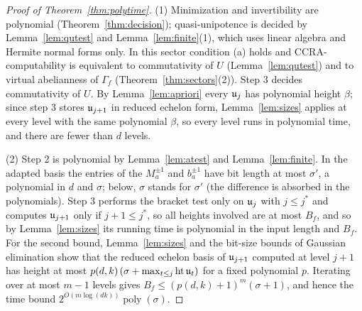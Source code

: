 \begin{proof}[Proof of Theorem~\ref{thm:polytime}]
(1) Minimization and invertibility are polynomial (Theorem~\ref{thm:decision}); quasi-unipotence is
decided by Lemma~\ref{lem:qutest} and Lemma~\ref{lem:finite}(1), which uses linear algebra and Hermite
normal forms only. In this sector condition (a) holds and CCRA-computability is equivalent to
commutativity of $U$ (Lemma~\ref{lem:qutest}) and to virtual abelianness of $\Gamma_f$
(Theorem~\ref{thm:sectors}(2)). Step 3 decides commutativity of $U$. By Lemma~\ref{lem:apriori}
every $\mathfrak{u}_j$ has polynomial height $\beta$; since step 3 stores $\mathfrak{u}_{j+1}$ in reduced echelon form,
Lemma~\ref{lem:sizes} applies at every level with the same polynomial $\beta$, so every level runs in
polynomial time, and there are fewer than $d$ levels.

(2) Step 2 is polynomial by Lemma~\ref{lem:atest} and Lemma~\ref{lem:finite}. In the adapted basis the
entries of the $M_a^{\pm1}$ and $b_a^{\pm1}$ have bit length at most $\sigma'$, a polynomial in $d$ and
$\sigma$; below, $\sigma$ stands for $\sigma'$ (the difference is absorbed in the polynomials). Step 3 performs the bracket test only on
$\mathfrak{u}_j$ with $j\le j^*$ and computes $\mathfrak{u}_{j+1}$ only if $j+1\le j^*$, so all heights involved are at most
$B_f$, and so by Lemma~\ref{lem:sizes} its running time is polynomial
in the input length and $B_f$. For the second bound, Lemma~\ref{lem:sizes} and the bit-size bounds of
Gaussian elimination show that the reduced echelon basis of $\mathfrak{u}_{j+1}$ computed at level $j+1$ has
height at most $p(d,k)\,(\sigma+\max_{t\le j}\operatorname{ht}\mathfrak{u}_t)$ for a fixed polynomial $p$. Iterating over at most
$m-1$ levels gives $B_f\le(p(d,k)+1)^{m}(\sigma+1)$, and hence the time bound
$2^{O(m\log(dk))}\operatorname{poly}(\sigma)$.


\end{proof}
